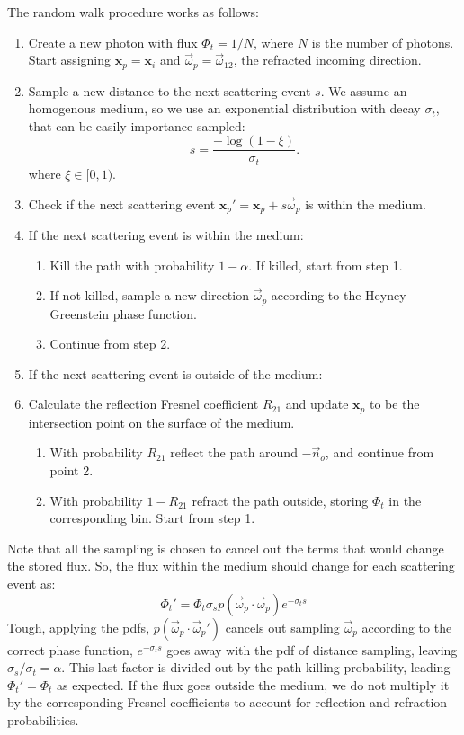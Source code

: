 \documentclass[10pt,a4paper]{article}
\newcommand{\x}{\mathbf{x}}
\newcommand{\vomega}{\vec{\omega}}
\begin{document}
The random walk procedure works as follows:
\begin{enumerate}
\item Create a new photon with flux $\Phi_t = 1 / N$, where $N$ is the number of photons. Start assigning $\x_p = \x_i$ and $\vomega_p = \vomega_{12}$, the refracted incoming direction.
\item Sample a new distance to the next scattering event $s$. We assume an homogenous medium, so we use an exponential distribution with decay $\sigma_t$, that can be easily importance sampled:
$$
s = \frac{-\log(1 -\xi)}{\sigma_t}.
$$
where $\xi \in [0,1)$.

\item Check if the next scattering event $\x_p' = \x_p + s \vomega_p $ is within the medium.
\item If the next scattering event is within the medium:
\begin{enumerate}
\item Kill the path with probability $1-\alpha$. If killed, start from step 1.
\item If not killed, sample a new direction $\vomega_p$ according to the Heyney-Greenstein phase function. 
\item Continue from step 2.
\end{enumerate}
\item If the next scattering event is outside of the medium:
\item Calculate the reflection Fresnel coefficient $R_{21}$ and update $\x_p$ to be the intersection point on the surface of the medium.  
\begin{enumerate}
\item With probability $R_{21}$ reflect the path around $-\vec{n}_o$, and continue from point 2.
\item With probability $1 - R_{21}$ refract the path outside, storing $\Phi_t$ in the corresponding bin. Start from step 1.
\end{enumerate}
\end{enumerate}
Note that all the sampling is chosen to cancel out the terms that would change the stored flux. So, the flux within the medium should change for each scattering event as:
$$
\Phi_t' = \Phi_t \sigma_s p(\vomega_p \cdot \vomega_p) e^{-\sigma_t s}
$$
Tough, applying the pdfs, $ p(\vomega_p \cdot \vomega_p')$ cancels out sampling $\vomega_p$ according to the correct phase function, $e^{-\sigma_t s}$ goes away with the pdf of distance sampling, leaving $\sigma_s/\sigma_t = \alpha$. This last factor is divided out by the path killing probability, leading $\Phi_t' = \Phi_t$ as expected.
If the flux goes outside the medium, we do not multiply it by the corresponding Fresnel coefficients to account for reflection and refraction probabilities.
 
\end{document}
